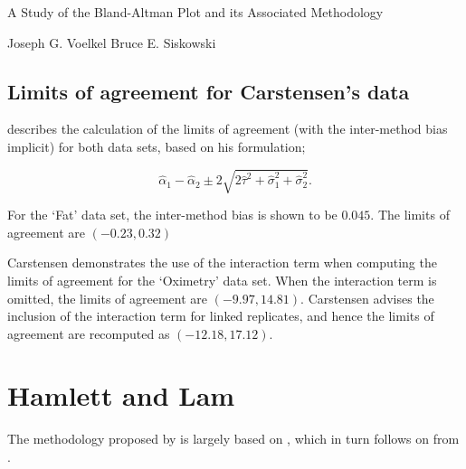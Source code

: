 \documentclass[12pt, a4paper]{report}
\begin{document}


A Study of the Bland-Altman Plot and its Associated Methodology

Joseph G. Voelkel Bruce E. Siskowski 



\subsection{Limits of agreement for Carstensen's data}


\citet{bxc2008} describes the calculation of the limits of agreement (with the inter-method bias implicit) for both data sets, based on his formulation;

\[\hat{\alpha}_1 - \hat{\alpha}_2 \pm 2\sqrt{2\hat{\tau}^2 +\hat{\sigma}_1^2 +\hat{\sigma}_2^2 }.\]

For the `Fat' data set, the inter-method bias is shown to be $0.045$. The limits of agreement are $(-0.23 , 0.32)$

Carstensen demonstrates the use of the interaction term when computing the limits of agreement for the `Oximetry' data set. When the interaction term is omitted, the limits of agreement are $(-9.97, 14.81)$. Carstensen advises the inclusion of the interaction term for linked replicates, and hence the limits of agreement are recomputed as $(-12.18,17.12)$.






\newpage
\section{Hamlett and Lam}
The methodology proposed by \citet{Roy2009} is largely based on \citet{hamlett}, which in turn follows on from \citet{lam}.

\end{document}
